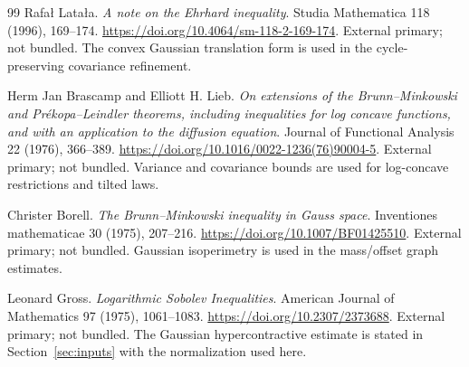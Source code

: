 \begin{thebibliography}{99}
Rafa\l{} Lata\l{}a. \emph{A note on the Ehrhard inequality}.
Studia Mathematica 118 (1996), 169--174.
\url{https://doi.org/10.4064/sm-118-2-169-174}.
External primary; not bundled. The convex Gaussian translation form is
used in the cycle-preserving covariance refinement.

Herm Jan Brascamp and Elliott H. Lieb.
\emph{On extensions of the Brunn--Minkowski and Pr\'ekopa--Leindler
 theorems, including inequalities for log concave functions, and with
 an application to the diffusion equation}.
Journal of Functional Analysis 22 (1976), 366--389.
\url{https://doi.org/10.1016/0022-1236(76)90004-5}.
External primary; not bundled. Variance and covariance bounds are used
for log-concave restrictions and tilted laws.

Christer Borell. \emph{The Brunn--Minkowski inequality in Gauss space}.
Inventiones mathematicae 30 (1975), 207--216.
\url{https://doi.org/10.1007/BF01425510}.
External primary; not bundled. Gaussian isoperimetry is used in the
mass/offset graph estimates.

Leonard Gross. \emph{Logarithmic Sobolev Inequalities}.
American Journal of Mathematics 97 (1975), 1061--1083.
\url{https://doi.org/10.2307/2373688}.
External primary; not bundled. The Gaussian hypercontractive estimate
is stated in Section~\ref{sec:inputs} with the normalization used here.

\end{thebibliography}

\endgroup
